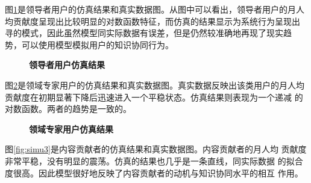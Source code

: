 图\ref{fig:simu1}是领导者用户的仿真结果和真实数据图。从图中可以看出，领导者用户的月人
均贡献度呈现出比较明显的对数函数特征，而仿真的结果显示为系统行为呈现出
寻的模式，因此虽然模型同实际数据有误差，但是仍然较准确地再现了现实趋
势，可以使用模型模拟用户的知识协同行为。

\begin{figure}[!htb]
  \centering
  \caption{\small{\textbf{领导者用户仿真结果}}}
  \label{fig:simu1}
\end{figure}

图\ref{fig:simu2}是领域专家用户的仿真结果和真实数据图。真实数据反映出该类用户的月人均
贡献度在初期显著下降后迅速进入一个平稳状态。仿真结果则表现为一个递减
的对数函数。两者的趋势是一致的。

\begin{figure}[!htb]
  \centering
  \caption{\small{\textbf{领域专家用户仿真结果}}}
  \label{fig:simu2}
\end{figure}

图\ref{fig:simu3}是内容贡献者的仿真结果和真实数据图。内容贡献者的月人均
贡献度非常平稳，没有明显的震荡。仿真的结果也几乎是一条直线，同实际数据
的拟合度很高。因此模型很好地反映了内容贡献者的动机与知识协同水平的相互
作用。

